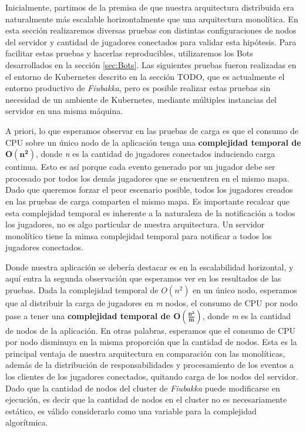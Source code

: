 
\noindent Inicialmente, partimos de la premisa de que nuestra arquitectura distribuida era naturalmente más escalable horizontalmente
que una arquitectura monolítica. En esta sección realizaremos diversas pruebas con distintas configuraciones de nodos del servidor y cantidad
de jugadores conectados para validar esta hipótesis. Para facilitar estas pruebas y hacerlas reproducibles, utilizaremos los Bots desarrollados
en la sección \ref{sec:Bots}. Las siguientes pruebas fueron realizadas en el entorno de Kubernetes descrito en la sección TODO, que es actualmente el entorno
productivo de \textit{Fiubakka}, pero es posible realizar estas pruebas sin necesidad de un ambiente de Kubernetes, mediante múltiples instancias del
servidor en una misma máquina.

A priori, lo que esperamos observar en las pruebas de carga es que el consumo de CPU sobre un único nodo de la aplicación tenga una \textbf{complejidad temporal
de $\boldsymbol{O(n^2)}$}, donde \textit{n} es la cantidad de jugadores conectados induciendo carga continua. Esto es así porque cada evento generado por un jugador debe ser procesado por todos los
demás jugadores que se encuentren en el mismo mapa. Dado que queremos forzar el peor escenario posible, todos los jugadores creados en las pruebas de carga comparten el mismo mapa.
Es importante recalcar que esta complejidad temporal es inherente a la naturaleza de la notificación a todos los jugadores, no es algo particular de nuestra arquitectura. Un servidor monolítico
tiene la mimsa complejidad temporal para notificar a todos los jugadores conectados.

Donde nuestra aplicación se debería destacar es en la escalabilidad horizontal, y aquí entra la segunda observación que esperamos ver en los resultados de las pruebas. Dada la complejidad temporal de
$O(n^2)$ en un único nodo, esperamos que al distribuir la carga de jugadores en \textit{m} nodos, el consumo de CPU por nodo pase a tener una \textbf{complejidad temporal de $\boldsymbol{O(\frac{n^2}{m})}$}, donde \textit{m} es la cantidad de nodos
de la aplicación. En otras palabras, esperamos que el consumo de CPU por nodo disminuya en la misma proporción que la cantidad de nodos. Esta es la principal ventaja de nuestra arquitectura en comparación con las monolíticas,
además de la distribución de responsabilidades y procesamiento de los eventos a los clientes de los jugadores conectados, quitando carga de los nodos del servidor.
Dado que la cantidad de nodos del cluster de \textit{Fiubakka} puede modificarse en ejecución, es decir que la cantidad de nodos en el cluster no es necesariamente estático, es válido considerarlo como una variable para la complejidad
algorítmica.

